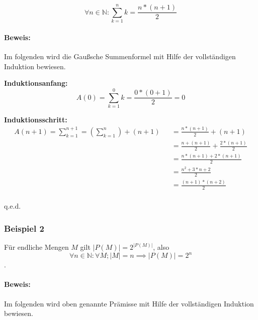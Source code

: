 \documentclass[12pt]{scrreprt}
\newcommand{\qed}{\begin{flushright}q.e.d.\end{flushright}}
\begin{document}
                    \[ \forall n \in \mathbb{N} : \sum _ { k = 1 } ^ n k = \frac{n * (n + 1)}{2} \]

                    \paragraph{Beweis:}

                        Im folgenden wird die Gaußsche Summenformel mit Hilfe der vollständigen Induktion bewiesen.

                        \textbf{Induktionsanfang:} \[ A(0) = \sum _ { k = 1 } ^ 0 k = \frac{0 * (0 + 1)}{2} = 0 \]

                        \textbf{Induktionsschritt:} 
                        \begin{eqnarray*}
                            A(n + 1) = \sum _ { k = 1 } ^ { n + 1 } = (\sum _ { k = 1 } ^ n) + (n + 1)
                                && = \frac{n * (n + 1)}{2} + (n + 1)                                    \\
                                && = \frac{n + (n + 1)}{2} + \frac{2 * (n + 1)}{2}                      \\
                                && = \frac{n * (n + 1) + 2 * (n + 1)}{2}                                \\
                                && = \frac{n ^ 2 + 3 * n + 2}{2}                                        \\
                                && = \frac{(n + 1) * (n + 2)}{2}                                        \\
                        \end{eqnarray*}

                        \qed


                \subsubsection{Beispiel 2}

                    Für endliche Mengen $ M $ gilt $ \vert P(M) \vert = 2 ^ { \vert P(M) \vert } $, also \[ \forall n \in \mathbb{N} : \forall M ; \vert M \vert = n \implies \vert P(M) \vert = 2 ^ n \].

                    \paragraph{Beweis:}

                        Im folgenden wird oben genannte Prämisse mit Hilfe der vollständigen Induktion bewiesen.
\end{document}
